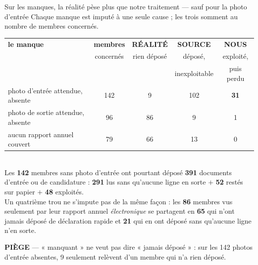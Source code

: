\documentclass[11pt,aspectratio=169]{beamer}
\newcommand{\piege}[1]{%
  \colorbox{warnorange!12}{\parbox{\dimexpr\linewidth-8pt}{\scriptsize
    \textbf{\textcolor{warnorange}{PIÈGE}}\; --- #1}}}
\begin{document}
\begin{frame}{Sur les manques, la réalité pèse plus que notre traitement --- sauf pour la photo d'entrée}
  \centering
  {\footnotesize Chaque manque est imputé à une seule cause ; les trois somment au nombre de
  membres concernés.}\\[2mm]
  {\scriptsize\begin{tabular}{l c c c c}
    \toprule
    \textbf{le manque} & \textbf{membres} & \textcolor{grisC}{\textbf{RÉALITÉ}} & \textcolor{warnorange}{\textbf{SOURCE}} & \textcolor{alertred}{\textbf{NOUS}}\\
     & concernés & rien déposé & déposé, & exploité,\\
     & & & inexploitable & puis perdu\\
    \midrule
    photo d'entrée attendue, absente     & 142 & 9  & 102 & \textbf{31}\\
    photo de sortie attendue, absente    & 96  & 86 & 9   & 1\\
    aucun rapport annuel couvert         & 79  & 66 & 13  & 0\\
    \bottomrule
  \end{tabular}}\\[3mm]
  {\scriptsize Les \textbf{142} membres sans photo d'entrée ont pourtant déposé \textbf{391}
  documents d'entrée ou de candidature : \textbf{291} lus sans qu'aucune ligne en sorte
  $+$ \textbf{52} restés sur papier $+$ \textbf{48} exploités.\\[1mm]
  Un quatrième trou ne s'impute pas de la même façon : les \textbf{86} membres vus seulement par
  leur rapport annuel \emph{électronique} se partagent en \textbf{65} qui n'ont jamais déposé de
  déclaration rapide et \textbf{21} qui en ont déposé sans qu'aucune ligne n'en sorte.}\\[1.5mm]
  \piege{« manquant » ne veut pas dire « jamais déposé » : sur les 142 photos d'entrée
  absentes, 9 seulement relèvent d'un membre qui n'a rien déposé.}
\end{frame}
\end{document}
